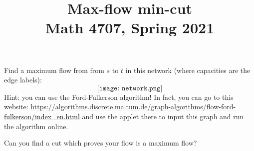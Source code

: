 \documentclass[11pt]{article}
\title{Max-flow min-cut \\ Math 4707, Spring 2021}
\begin{document}
\maketitle

\thispagestyle{empty}


Find a maximum flow from from $s$ to $t$ in this network (where capacities are the edge labels):
\[ \texttt{[image: network.png]} \]
Hint: you can use the Ford-Fulkerson algorithm! In fact, you can go to this website: {\small \url{https://algorithms.discrete.ma.tum.de/graph-algorithms/flow-ford-fulkerson/index_en.html}} and use the applet there to input this graph and run the algorithm online.

Can you find a cut which proves your flow is a maximum flow?
\end{document}
